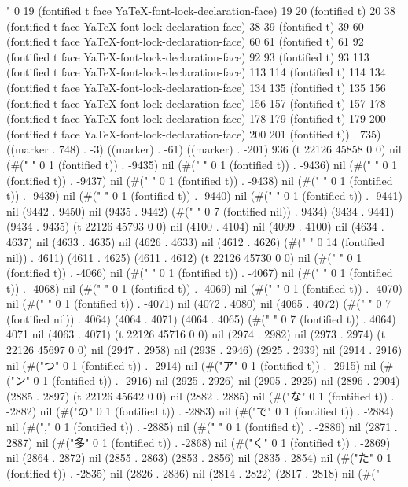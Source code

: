 " 0 19 (fontified t face YaTeX-font-lock-declaration-face) 19 20 (fontified t) 20 38 (fontified t face YaTeX-font-lock-declaration-face) 38 39 (fontified t) 39 60 (fontified t face YaTeX-font-lock-declaration-face) 60 61 (fontified t) 61 92 (fontified t face YaTeX-font-lock-declaration-face) 92 93 (fontified t) 93 113 (fontified t face YaTeX-font-lock-declaration-face) 113 114 (fontified t) 114 134 (fontified t face YaTeX-font-lock-declaration-face) 134 135 (fontified t) 135 156 (fontified t face YaTeX-font-lock-declaration-face) 156 157 (fontified t) 157 178 (fontified t face YaTeX-font-lock-declaration-face) 178 179 (fontified t) 179 200 (fontified t face YaTeX-font-lock-declaration-face) 200 201 (fontified t)) . 735) ((marker . 748) . -3) ((marker) . -61) ((marker) . -201) 936 (t 22126 45858 0 0) nil (#(" " 0 1 (fontified t)) . -9435) nil (#(" " 0 1 (fontified t)) . -9436) nil (#(" " 0 1 (fontified t)) . -9437) nil (#(" " 0 1 (fontified t)) . -9438) nil (#(" " 0 1 (fontified t)) . -9439) nil (#(" " 0 1 (fontified t)) . -9440) nil (#(" " 0 1 (fontified t)) . -9441) nil (9442 . 9450) nil (9435 . 9442) (#("       " 0 7 (fontified nil)) . 9434) (9434 . 9441) (9434 . 9435) (t 22126 45793 0 0) nil (4100 . 4104) nil (4099 . 4100) nil (4634 . 4637) nil (4633 . 4635) nil (4626 . 4633) nil (4612 . 4626) (#("              " 0 14 (fontified nil)) . 4611) (4611 . 4625) (4611 . 4612) (t 22126 45730 0 0) nil (#(" " 0 1 (fontified t)) . -4066) nil (#(" " 0 1 (fontified t)) . -4067) nil (#(" " 0 1 (fontified t)) . -4068) nil (#(" " 0 1 (fontified t)) . -4069) nil (#(" " 0 1 (fontified t)) . -4070) nil (#(" " 0 1 (fontified t)) . -4071) nil (4072 . 4080) nil (4065 . 4072) (#("       " 0 7 (fontified nil)) . 4064) (4064 . 4071) (4064 . 4065) (#("       " 0 7 (fontified t)) . 4064) 4071 nil (4063 . 4071) (t 22126 45716 0 0) nil (2974 . 2982) nil (2973 . 2974) (t 22126 45697 0 0) nil (2947 . 2958) nil (2938 . 2946) (2925 . 2939) nil (2914 . 2916) nil (#("つ" 0 1 (fontified t)) . -2914) nil (#("ア" 0 1 (fontified t)) . -2915) nil (#("ン" 0 1 (fontified t)) . -2916) nil (2925 . 2926) nil (2905 . 2925) nil (2896 . 2904) (2885 . 2897) (t 22126 45642 0 0) nil (2882 . 2885) nil (#("な" 0 1 (fontified t)) . -2882) nil (#("の" 0 1 (fontified t)) . -2883) nil (#("で" 0 1 (fontified t)) . -2884) nil (#("," 0 1 (fontified t)) . -2885) nil (#(" " 0 1 (fontified t)) . -2886) nil (2871 . 2887) nil (#("多" 0 1 (fontified t)) . -2868) nil (#("く" 0 1 (fontified t)) . -2869) nil (2864 . 2872) nil (2855 . 2863) (2853 . 2856) nil (2835 . 2854) nil (#("た" 0 1 (fontified t)) . -2835) nil (2826 . 2836) nil (2814 . 2822) (2817 . 2818) nil (#("
